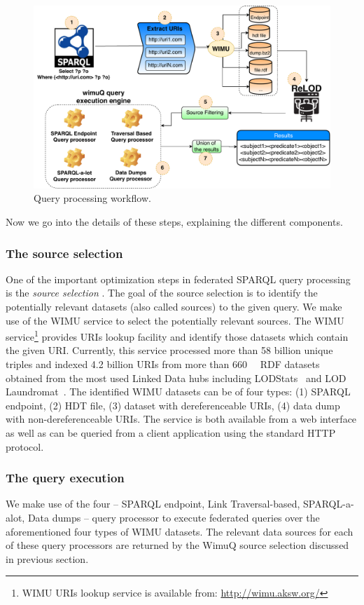 \documentclass[sw]{iosart2x}
\begin{document}
\begin{figure}[htb] 
	\centering
	\includegraphics[width=0.8\linewidth]{img/wimuQ2.pdf}
	\caption{Query processing workflow.}
	\label{fig:approachWimuQ}
\end{figure}

Now we go into the details of these steps, explaining the different components. 

\subsubsection{The source selection}
One of the important optimization steps in federated SPARQL query processing is the \emph{source selection} \cite{costfed2017,hibiscus2014}. The goal of the source selection is to identify the potentially relevant datasets (also called sources) to the given query. We make use of the WIMU service \cite{valdestilhas2018my} to select the potentially relevant sources. The WIMU service\footnote{WIMU URIs lookup service is available from: \url{http://wimu.aksw.org/}} provides URIs lookup facility and identify those datasets which contain the given URI. Currently, this service processed more than 58 billion unique triples and indexed 4.2 billion URIs from more than \SI{660}{\kilo\nothing} RDF datasets obtained from the most used Linked Data hubs including LODStats~\cite{auer2012lodstats} and LOD Laundromat~\cite{beek2014lod}. The identified WIMU datasets can be of four types: (1) SPARQL endpoint, (2) HDT file, (3) dataset with dereferenceable URIs, (4) data dump with non-dereferenceable URIs. 
The service is both available from a web interface as well as can be queried from a client application using the standard HTTP protocol.

\subsubsection{The query execution}
We make use of the four -- SPARQL endpoint, Link Traversal-based, SPARQL-a-alot, Data dumps -- query processor to execute federated queries over the aforementioned four types of WIMU datasets. The relevant data sources for each of these query processors are returned by the WimuQ source selection discussed in previous section. 
\end{document}
